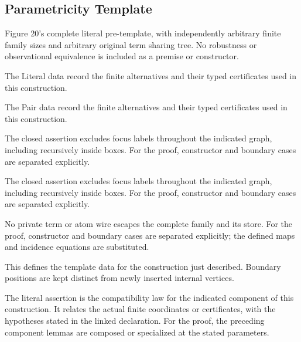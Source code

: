 \subsection{Parametricity Template}
Figure 20's complete literal pre-template, with independently arbitrary finite family sizes and arbitrary original term sharing tree. No robustness or observational equivalence is included as a premise or constructor.

The Literal data record the finite alternatives and their typed certificates used in this construction.
\par{}

The Pair data record the finite alternatives and their typed certificates used in this construction.
\par{}

The closed assertion excludes focus labels throughout the indicated graph, including recursively inside boxes.
For the proof, constructor and boundary cases are separated explicitly.
\par{}

The closed assertion excludes focus labels throughout the indicated graph, including recursively inside boxes.
For the proof, constructor and boundary cases are separated explicitly.
\par{}

No private term or atom wire escapes the complete family and its store.
For the proof, constructor and boundary cases are separated explicitly; the defined maps and incidence equations are substituted.
\par{}

This defines the template data for the construction just described. Boundary positions are kept distinct from newly inserted internal vertices.
\par{}

The literal assertion is the compatibility law for the indicated component of this construction. It relates the actual finite coordinates or certificates, with the hypotheses stated in the linked declaration.
For the proof, the preceding component lemmas are composed or specialized at the stated parameters.
\par{}

